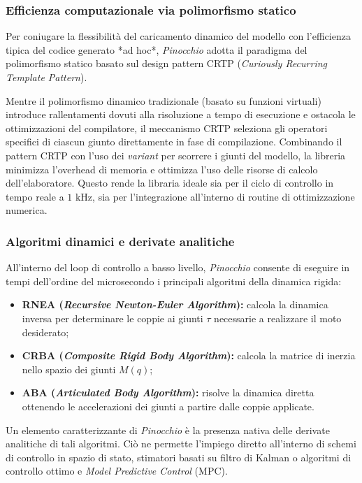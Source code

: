 \subsubsection{Efficienza computazionale via polimorfismo statico}
Per coniugare la flessibilità del caricamento dinamico del modello con l'efficienza tipica del codice generato *ad hoc*, \textit{Pinocchio} adotta il paradigma del polimorfismo statico basato sul design pattern CRTP (\textit{Curiously Recurring Template Pattern}). 

Mentre il polimorfismo dinamico tradizionale (basato su funzioni virtuali) introduce rallentamenti dovuti alla risoluzione a tempo di esecuzione e ostacola le ottimizzazioni del compilatore, il meccanismo CRTP seleziona gli operatori specifici di ciascun giunto direttamente in fase di compilazione. Combinando il pattern CRTP con l'uso dei \textit{variant} per scorrere i giunti del modello, la libreria minimizza l'overhead di memoria e ottimizza l'uso delle risorse di calcolo dell'elaboratore. Questo rende la libraria ideale sia per il ciclo di controllo in tempo reale a $1\text{ kHz}$, sia per l'integrazione all'interno di routine di ottimizzazione numerica.

\subsubsection{Algoritmi dinamici e derivate analitiche}
All'interno del loop di controllo a basso livello, \textit{Pinocchio} consente di eseguire in tempi dell'ordine del microsecondo i principali algoritmi della dinamica rigida:
\begin{itemize}
    \item \textbf{RNEA (\textit{Recursive Newton-Euler Algorithm}):} calcola la dinamica inversa per determinare le coppie ai giunti $\tau$ necessarie a realizzare il moto desiderato;
    \item \textbf{CRBA (\textit{Composite Rigid Body Algorithm}):} calcola la matrice di inerzia nello spazio dei giunti $M(q)$;
    \item \textbf{ABA (\textit{Articulated Body Algorithm}):} risolve la dinamica diretta ottenendo le accelerazioni dei giunti a partire dalle coppie applicate.
\end{itemize}

Un elemento caratterizzante di \textit{Pinocchio} è la presenza nativa delle derivate analitiche di tali algoritmi. Ciò ne permette l'impiego diretto all'interno di schemi di controllo in spazio di stato, stimatori basati su filtro di Kalman o algoritmi di controllo ottimo e \textit{Model Predictive Control} (MPC).


